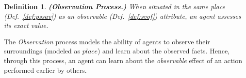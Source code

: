 \documentclass[letterpaper]{article} %
\newtheorem{definition}{Definition}
\begin{document}

\begin{definition} 
\label{def:obs}
    \textbf{(Observation Process.)} When situated in the same place (Def.~\ref{def:pssav}) as an observable (Def.~\ref{def:svof}) attribute, an agent assesses its exact value.  
\end{definition}



The \textit{Observation} process models the ability of agents to observe their surroundings (modeled as $place$) and 
learn about the observed facts. 
Hence, through this process, an agent can learn about the \textit{observable} effect of an action performed earlier by others. 

\end{document}
